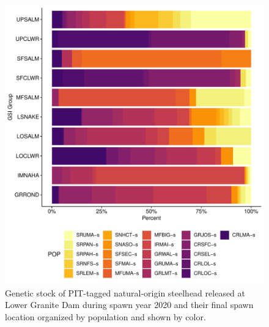 \documentclass[11pt,a4paper,]{article}
\begin{document}
\begin{figure}
\centering
\includegraphics{Kelt_Summary_files/figure-latex/sum-gsi-pop-percent-1.pdf}
\caption{\label{fig:sum-gsi-pop-percent}Genetic stock of PIT-tagged natural-origin steelhead released at Lower Granite Dam during spawn year 2020 and their final spawn location organized by population and shown by color.}
\end{figure}
\end{document}
